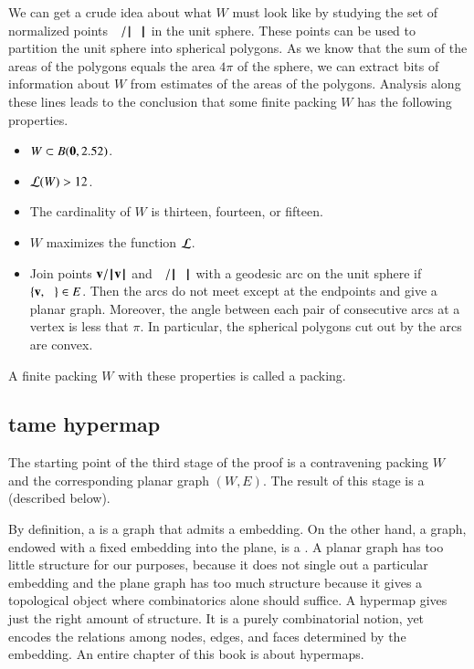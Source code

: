 We can get a crude idea about what $W$ must look like by studying the
set of normalized points $\w/\normo{\w}$ in the unit sphere.  These
points can be used to partition the unit sphere into spherical
polygons.  As we know that the sum of the areas of the polygons equals
the area $4\pi$ of the sphere, we can extract bits of information
about $W$ from estimates of the areas of the polygons.  Analysis along
these lines leads to the conclusion that some finite packing $W$
has the following
properties.
\begin{itemize}
\item $W\subset B({\mathbf 0},2.52)$.
\item ${\mathcal L}(W) > 12$.
\item The cardinality of $W$ is thirteen, fourteen, or fifteen.
\item $W$ maximizes the function ${\mathcal L}$.
\item Join points ${\mathbf v}/{{\hskip0.1em|\hskip-0.15em|\hskip0.1em}{\mathbf v}{\hskip0.1em|\hskip-0.15em|\hskip0.1em}}$ and $\w/\normo{\w}$ with a geodesic arc on the
unit sphere if $\{{\mathbf v},\hskip0.65em\}\in E$.  Then the arcs do not meet except at the endpoints and
give a planar graph.  Moreover, the angle between each pair of consecutive arcs at a vertex is less
that $\pi$.  In particular, the spherical polygons cut out by the arcs are convex.
\end{itemize}
A finite packing $W$ with these properties is called a  packing.


\subsection{tame hypermap}

The starting point of the third stage of the proof is a contravening
packing $W$ and the corresponding planar graph $(W,E)$.  The result of
this stage is a  (described below).

By definition, a  is a graph that admits a
 embedding.  On the other hand, a graph, endowed with
a fixed embedding into the plane, is a .  A
planar graph has too little structure for our purposes, because it
does not single out a particular embedding and the plane graph has too
much structure because it gives a topological object where combinatorics
alone should suffice.  A hypermap gives just the right amount of
structure.  It is a purely combinatorial notion, yet encodes the
relations among nodes, edges, and faces determined by the embedding.
An entire chapter of this book is about hypermaps.

